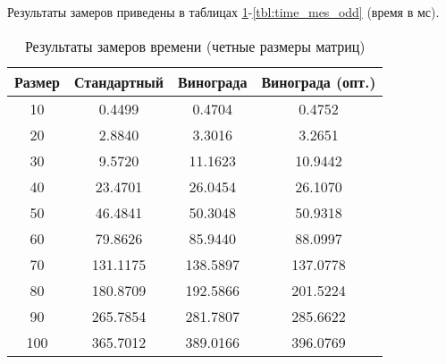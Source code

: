 Результаты замеров приведены в таблицах \ref{tbl:time_mes_even}-\ref{tbl:time_mes_odd} (время в мс).

\begin{table}[h]
    \begin{center}
        \begin{threeparttable}
        \captionsetup{justification=raggedright,singlelinecheck=off}
        \caption{Результаты замеров времени (четные размеры матриц)}
        \label{tbl:time_mes_even}
        \begin{tabular}{|c|c|c|c|}
            \hline
            Размер & Стандартный & Винограда & Винограда (опт.) \\
            \hline
            10 & 0.4499 & 0.4704 & 0.4752 \\ 
            \hline
            20 & 2.8840 & 3.3016 & 3.2651 \\ 
            \hline
            30 & 9.5720 & 11.1623 & 10.9442 \\ 
            \hline
            40 & 23.4701 & 26.0454 & 26.1070 \\ 
            \hline
            50 & 46.4841 & 50.3048 & 50.9318 \\ 
            \hline
            60 & 79.8626 & 85.9440 & 88.0997 \\ 
            \hline
            70 & 131.1175 & 138.5897 & 137.0778 \\ 
            \hline
            80 & 180.8709 & 192.5866 & 201.5224 \\ 
            \hline
            90 & 265.7854 & 281.7807 & 285.6622 \\ 
            \hline
            100 & 365.7012 & 389.0166 & 396.0769 \\ 
            \hline
		\end{tabular}
    \end{threeparttable}
\end{center}
\end{table}

\clearpage


